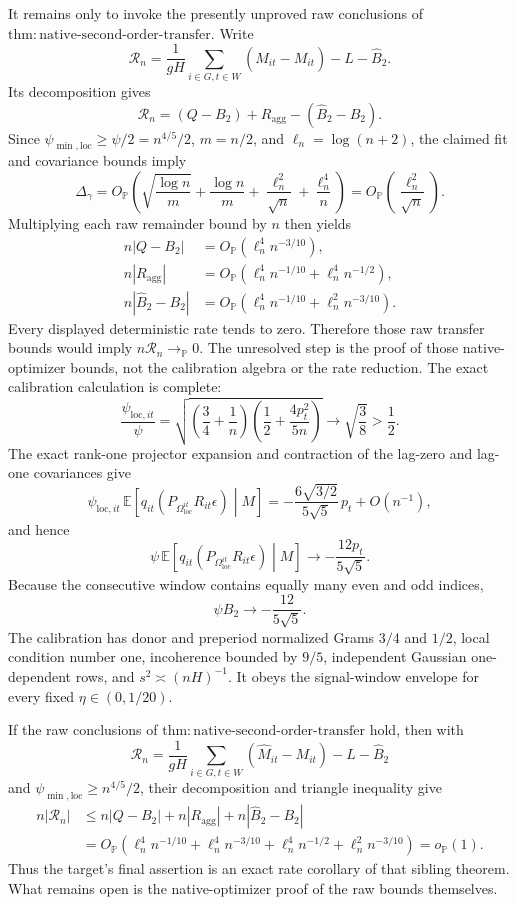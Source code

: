 It remains only to invoke the presently unproved raw conclusions of \(\mathrm{thm:native\mbox{-}second\mbox{-}order\mbox{-}transfer}\).  Write
\[
\mathcal R_n=
\frac1{gH}\sum_{i\in G,t\in W}(\widehat M_{it}-M_{it})
-L-\widehat B_2.
\]
Its decomposition gives
\[
\mathcal R_n=(Q-B_2)+R_{\mathrm{agg}}-(\widehat B_2-B_2).
\]
Since \(\psi_{\min,\mathrm{loc}}\ge\psi/2=n^{4/5}/2\), \(m=n/2\), and \(\ell_n=\log(n+2)\), the claimed fit and covariance bounds imply
\[
\Delta_\gamma
=O_{\mathbb P}\!\left(
\sqrt{\frac{\log n}{m}}+\frac{\log n}{m}
+\frac{\ell_n^2}{\sqrt n}+\frac{\ell_n^4}{n}
\right)
=O_{\mathbb P}\!\left(\frac{\ell_n^2}{\sqrt n}\right).
\]
Multiplying each raw remainder bound by \(n\) then yields
\[
\begin{aligned}
n|Q-B_2|
&=O_{\mathbb P}(\ell_n^4n^{-3/10}),\\
n|R_{\mathrm{agg}}|
&=O_{\mathbb P}\!\left(\ell_n^4n^{-1/10}
+\ell_n^4n^{-1/2}\right),\\
n|\widehat B_2-B_2|
&=O_{\mathbb P}\!\left(\ell_n^4n^{-1/10}
+\ell_n^2n^{-3/10}\right).
\end{aligned}
\]
Every displayed deterministic rate tends to zero.  Therefore those raw transfer bounds would imply \(n\mathcal R_n\to_{\mathbb P}0\).  The unresolved step is the proof of those native-optimizer bounds, not the calibration algebra or the rate reduction.
The exact calibration calculation is complete:
\[
\frac{\psi_{\mathrm{loc},it}}{\psi}
=\sqrt{\left(\frac34+\frac1n\right)
\left(\frac12+\frac{4p_t^2}{5n}\right)}
\longrightarrow\sqrt{\frac38}>\frac12.
\]
The exact rank-one projector expansion and contraction of the lag-zero and lag-one covariances give
\[
\psi_{\mathrm{loc},it}\,
\mathbb E\!\left[
q_{it}\!\left(P_{\Omega_{\mathrm{loc}}^{it}}R_{it}\epsilon\right)
\middle|M\right]
=-\frac{6\sqrt{3/2}}{5\sqrt5}\,p_t+O(n^{-1}),
\]
and hence
\[
\psi\,
\mathbb E\!\left[
q_{it}\!\left(P_{\Omega_{\mathrm{loc}}^{it}}R_{it}\epsilon\right)
\middle|M\right]
\longrightarrow-\frac{12p_t}{5\sqrt5}.
\]
Because the consecutive window contains equally many even and odd indices,
\[
\psi B_2\longrightarrow-\frac{12}{5\sqrt5}.
\]
The calibration has donor and preperiod normalized Grams \(3/4\) and \(1/2\), local condition number one, incoherence bounded by \(9/5\), independent Gaussian one-dependent rows, and \(s^2\asymp(nH)^{-1}\).  It obeys the signal-window envelope for every fixed \(\eta\in(0,1/20)\).

If the raw conclusions of \(\mathrm{thm:native\mbox{-}second\mbox{-}order\mbox{-}transfer}\) hold, then with
\[
\mathcal R_n=
\frac1{gH}\sum_{i\in G,t\in W}(\widehat M_{it}-M_{it})
-L-\widehat B_2
\]
and \(\psi_{\min,\mathrm{loc}}\ge n^{4/5}/2\), their decomposition and triangle inequality give
\[
\begin{aligned}
n|\mathcal R_n|
&\le n|Q-B_2|+n|R_{\mathrm{agg}}|+n|\widehat B_2-B_2|\\
&=O_{\mathbb P}\!\left(
\ell_n^4n^{-1/10}
+\ell_n^4n^{-3/10}
+\ell_n^4n^{-1/2}
+\ell_n^2n^{-3/10}
\right)
=o_{\mathbb P}(1).
\end{aligned}
\]
Thus the target's final assertion is an exact rate corollary of that sibling theorem.  What remains open is the native-optimizer proof of the raw bounds themselves.
